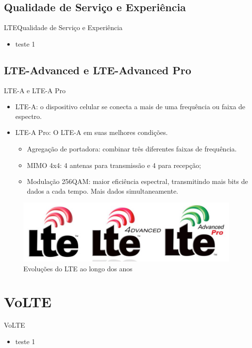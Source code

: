 \documentclass[10pt,aspectratio=169]{beamer} %
\begin{document}
\subsection{Qualidade de Serviço e Experiência}
\begin{frame}{LTE}{Qualidade de Serviço e Experiência}
    \begin{itemize}
        \item teste 1
    \end{itemize}
\end{frame}
\subsection{LTE-Advanced e LTE-Advanced Pro}
\begin{frame}{LTE-A e LTE-A Pro}
\begin{itemize}
    \item LTE-A: o dispositivo celular se conecta a mais de uma frequência ou faixa de espectro.
    \item LTE-A Pro: O LTE-A em suas melhores condições.
    \begin{itemize}
        \item Agregação de portadora: combinar três diferentes faixas de frequência.
        \item MIMO 4x4: 4 antenas para transmissão e 4 para recepção;
        \item Modulação 256QAM: maior eficiência espectral, transmitindo mais bits de dados a cada tempo. Mais dados simultaneamente.
    \end{itemize}
\end{itemize}
\begin{figure}[!htb]
    \centering
    \includegraphics[scale=0.3]{LRCgraphics/LTE_logos.png}
    \caption{Evoluções do LTE ao longo dos anos}
\end{figure}
\end{frame}
\section{VoLTE}
\begin{frame}{VoLTE}
    \begin{itemize}
        \item teste 1
    \end{itemize}
\end{frame}
\end{document}
